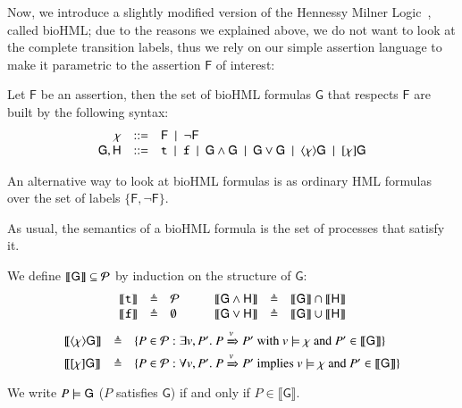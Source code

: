 Now, we introduce a slightly modified version of the Hennessy Milner Logic~\cite{HM80}, called bioHML; due to the reasons we explained above, we do not want to look at the complete transition labels, thus we rely on our simple assertion language to make it parametric to the assertion $\mathsf{F}$ of interest:

\begin{definition}[BioHML]
Let   $\mathsf{F}$ be an assertion, then 
the set of bioHML formulas $\mathsf{G}$ that respects $\mathsf{F}$ are built by the following syntax:
$$
\begin{array}{rcl}
\chi & ::= & \mathsf{F}~\mid~ \neg \mathsf{F}\\
\mathsf{G},\mathsf{H} &::= &{\tt t} ~\mid~ {\tt f} ~\mid~ \mathsf{G}\wedge \mathsf{G} ~\mid~ \mathsf{G} \vee \mathsf{G} ~\mid~ \langle \chi \rangle \mathsf{G} ~\mid~ [\chi]\mathsf{G}
\end{array}
$$
\end{definition}

\begin{remark}
An alternative way to look at bioHML formulas is as ordinary HML formulas over the set of labels $\{\mathsf{F},\neg \mathsf{F}\}$.
\end{remark}

As usual, the semantics of a bioHML formula is the set of processes that satisfy it.

\begin{definition}
 We define $\llbracket \mathsf{G}\rrbracket \subseteq {\cal P}$ by induction on the structure of $\mathsf{G}$:
\[
\begin{array}{ccl@{\hspace{1cm}}ccl}
 \llbracket {\tt t}\rrbracket &\defeq& {\cal P} &  \llbracket \mathsf{G}\wedge \mathsf{H}\rrbracket &\defeq&  \llbracket \mathsf{G}\rrbracket  \cap \llbracket \mathsf{H}\rrbracket  \\
\llbracket {\tt f}\rrbracket& \defeq& \emptyset &
  \llbracket \mathsf{G}\vee \mathsf{H}\rrbracket &\defeq&  \llbracket \mathsf{G}\rrbracket  \cup \llbracket \mathsf{H}\rrbracket \\
\end{array}
\]
\[
\begin{array}{lcl}
 \llbracket  \langle \chi \rangle \mathsf{G} \rrbracket &\triangleq& \{P \in {\cal P}: \exists v,P'.\ P\xRightarrow{v}P' \mbox{ with } v \models \chi \mbox{ and } P' \in  \llbracket  \mathsf{G} \rrbracket\} \\
 \llbracket [\chi]\mathsf{G} \rrbracket &\triangleq& \{P \in {\cal P}: \forall v,P'.\ P\xRightarrow{v}P' \mbox{ implies } v \models \chi \mbox{ and } P' \in  \llbracket  \mathsf{G} \rrbracket\}
\end{array}
\]
We write $P \models \mathsf{G}$ ($P$ satisfies $\mathsf{G}$) if and only if $P \in  \llbracket \mathsf{G} \rrbracket$.
\end{definition}

